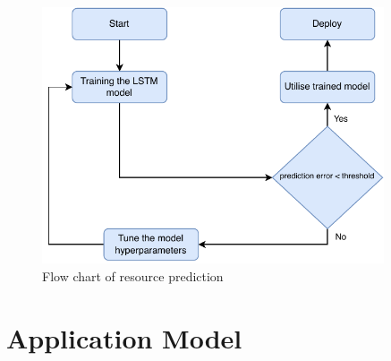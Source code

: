         \begin{figure}
            \centering
            \includegraphics[width=0.9\textwidth]{figures/training_flowchart.pdf}
            \caption{Flow chart of resource prediction}
            \label{fig:flow-chart-of-resource-prediction}
        \end{figure}



    \section{Application Model}
    \label{sec:application-model}




